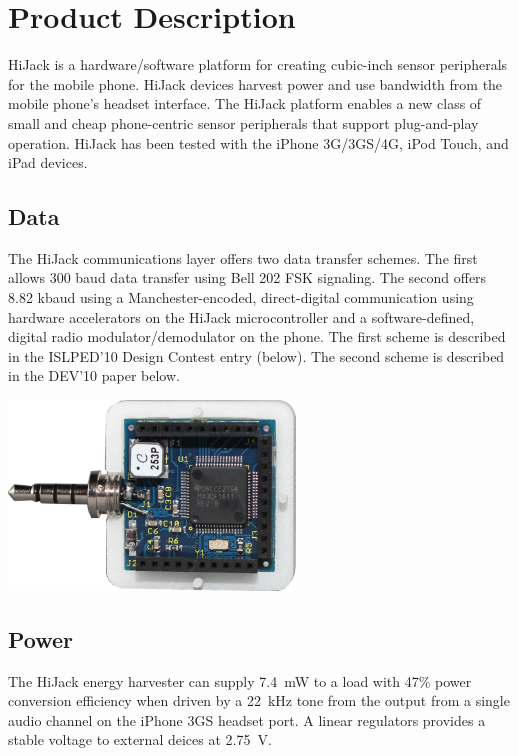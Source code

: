 \documentclass[10pt,letterpaper]{datasheet}
\begin{document}
\title{\color{blue}{\bf HiJack}}
\author{Thomas Schmid \& Prabal Dutta}
\date{}
\maketitle
\makefooter
\thispagestyle{fancy}

\section*{Product Description}
\begin{multicols}{2}
HiJack is a hardware/software platform for creating cubic-inch sensor
peripherals for the mobile phone. HiJack devices harvest power and use
bandwidth from the mobile phone's headset interface. The HiJack platform
enables a new class of small and cheap phone-centric sensor peripherals that
support plug-and-play operation. HiJack has been tested with the iPhone
3G/3GS/4G, iPod Touch, and iPad devices.

\subsection*{Data}
The HiJack communications layer offers two data transfer schemes. The first
allows 300 baud data transfer using Bell 202 FSK signaling. The second offers
8.82 kbaud using a Manchester-encoded, direct-digital communication using
hardware accelerators on the HiJack microcontroller and a software-defined,
digital radio modulator/demodulator on the phone. The first scheme is
described in the ISLPED'10 Design Contest entry (below). The second scheme is
described in the DEV'10 paper below.

  \begin{center}
    \includegraphics[width=3in]{hijack.jpg}
  \end{center}

\subsection*{Power}
The HiJack energy harvester can supply 7.4~mW to a load with 47\% power
conversion efficiency when driven by a 22~kHz tone from the output from a
single audio channel on the iPhone 3GS headset port. A linear regulators
provides a stable voltage to external deices at 2.75~V.




\end{multicols}
\end{document}
